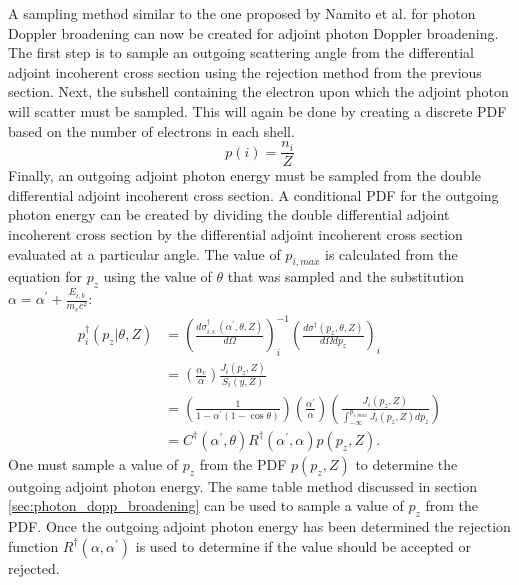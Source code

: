 A sampling method similar to the one proposed by Namito et al. for photon 
Doppler broadening can now be created for adjoint photon Doppler broadening. 
The first step is to sample an outgoing scattering angle from the differential
adjoint incoherent cross section using the rejection method from the 
previous section. Next, the subshell containing the electron upon which the
adjoint photon will scatter must be sampled. This will again be done by
creating a discrete PDF based on the number of electrons in each shell.
\begin{equation*}
  p(i) = \frac{n_i}{Z}
\end{equation*}
Finally, an outgoing adjoint photon energy must be sampled from the double
differential adjoint incoherent cross section. A conditional PDF for the 
outgoing photon energy can be created by dividing the double differential
adjoint incoherent cross section by the differential adjoint incoherent cross
section evaluated at a particular angle. The value of $p_{i,max}$ is 
calculated from the equation for $p_z$ using the value of $\theta$ that was 
sampled and the substitution $\alpha = \alpha^{'} + \frac{E_{i,b}}{m_ec^2}$:
\begin{align}
  p_i^{\dagger}(p_z|\theta,Z) & = 
  \left(\frac{d\sigma_{i.s.}^{\dagger}(\alpha^{'},\theta,Z)}{d\Omega}\right)_i^{-1}
  \left(\frac{d\sigma^{\dagger}(p_z,\theta,Z)}{d\Omega dp_z} \right)_i \nonumber\\
  & = \left(\frac{\alpha_c}{\alpha}\right)\frac{J_i(p_z,Z)}{S_i(y,Z)}
  \nonumber \\
  & = \left(\frac{1}{1-\alpha^{'}(1-\cos{\theta})}\right)
  \left(\frac{\alpha^{'}}{\alpha}\right) 
  \left(\frac{J_i(p_z,Z)}{\int_{-\infty}^{p_{i,max}}J_i(p_z,Z) dp_z}\right)
  \nonumber \\
  & = C^{\dagger}(\alpha^{'},\theta)R^{\dagger}(\alpha^{'},\alpha)p(p_z,Z).
\end{align}
One must sample a value of $p_z$ from the PDF $p(p_z,Z)$ to determine the
outgoing adjoint photon energy. The same table method discussed in section
\ref{sec:photon_dopp_broadening} can be used to sample a value of $p_z$ from
the PDF. Once the outgoing adjoint photon energy has been determined the 
rejection function $R^{\dagger}(\alpha,\alpha^{'})$ is used to determine if the 
value should be accepted or rejected. 

